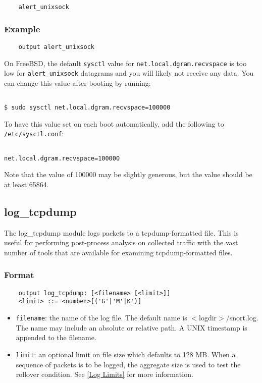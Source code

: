 \documentclass[english]{report}
\newenvironment{note}{
\samepage
    \vspace{10pt}{\textsf{
        {\hspace{7pt}\Huge{$\triangle$\hspace{-12.5pt}{\Large{$^!$}}}}\hspace{5pt}
        {\Large{NOTE}}
    }
    }
   \begin{center}
    \par\vspace{-17pt}

    \begin{lrbox}{\savepar}
    \begin{minipage}[r]{6in}
}
{
    \end{minipage}
    \end{lrbox}
    \fbox{
        \usebox{
            \savepar
	}
    }
    \par\vskip10pt
    \end{center}
}
\newenvironment{note}{
        \begin{rawhtml}
        <p><table border="1"><tr><td><b>
        Note:&nbsp;&nbsp;</b>
        \end{rawhtml}
}{
        \begin{rawhtml}
        </b></td></tr></table></p>
        \end{rawhtml}
}
\begin{document}
\begin{verbatim}
    alert_unixsock
\end{verbatim}

\subsubsection{Example}

\begin{verbatim}
    output alert_unixsock
\end{verbatim}

\begin{note}
On FreeBSD, the default \texttt{sysctl} value for \texttt{net.local.dgram.recvspace}
is too low for \texttt{alert\_unixsock} datagrams and you will likely not receive any
data.  You can change this value after booting by running:
\begin{verbatim}

$ sudo sysctl net.local.dgram.recvspace=100000

\end{verbatim}
To have this value set on each boot automatically, add the following to \texttt{/etc/sysctl.conf}:
\begin{verbatim}

net.local.dgram.recvspace=100000

\end{verbatim}
Note that the value of 100000 may be slightly generous, but the value should be at least 65864.
\end{note}

\subsection{log\_tcpdump}

The log\_tcpdump module logs packets to a tcpdump-formatted file.  This is
useful for performing post-process analysis on collected traffic with the vast
number of tools that are available for examining tcpdump-formatted files.

\subsubsection{Format}

\begin{verbatim}
    output log_tcpdump: [<filename> [<limit>]]
    <limit> ::= <number>[('G'|'M'|K')]
\end{verbatim}

\begin{itemize}
\item \texttt{filename}: the name of the log file.  The default name is
$<$logdir$>$/snort.log.  The name may include an absolute or relative path.  A
UNIX timestamp is appended to the filename.

\item \texttt{limit}: an optional limit on file size which defaults to 128 MB.
When a sequence of packets is to be logged, the aggregate size is used to test
the rollover condition.  See \ref{Log Limits} for more information.
\end{itemize}
\end{document}
